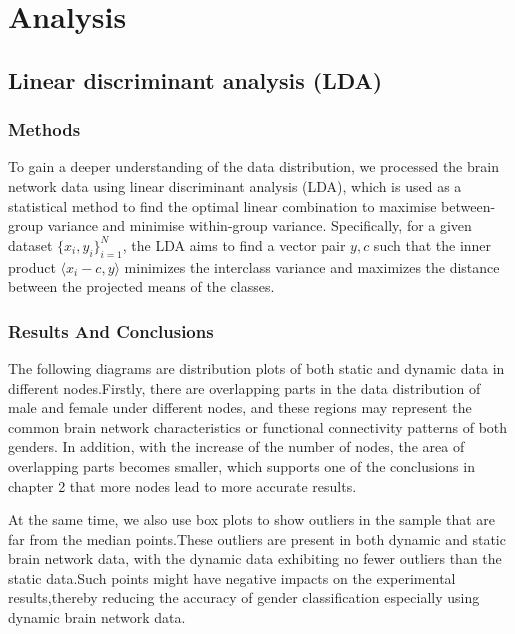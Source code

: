 \documentclass[11pt]{article}
\begin{document}
\section{Analysis}

\subsection{Linear discriminant analysis (LDA)}

\subsubsection{Methods}

To gain a deeper understanding of the data distribution, we processed the brain network data using linear discriminant analysis (LDA), which is used as a statistical method to find the optimal linear combination to maximise between-group variance and minimise within-group variance. Specifically, for a given dataset $\{x_i, y_i\}_{i=1}^N$, the LDA aims to find a vector pair $y, c$ such that the inner product $\langle x_i  - c, y \rangle$ minimizes the interclass variance and maximizes the distance between the projected means of the classes.

\subsubsection{Results And Conclusions}

The following diagrams are distribution plots of both static and dynamic data in different nodes.Firstly, there are overlapping parts in the data distribution of male and female under different nodes, and these regions may represent the common brain network characteristics or functional connectivity patterns of both genders. In addition, with the increase of the number of nodes, the area of overlapping parts becomes smaller, which supports one of the conclusions in chapter 2 that more nodes lead to more accurate results.

At the same time, we also use box plots to show outliers in the sample that are far from the median points.These outliers are present in both dynamic and static brain network data, with the dynamic data exhibiting no fewer outliers than the static data.Such points might have negative impacts on the experimental results,thereby reducing the accuracy of gender classification especially using dynamic brain network data.
\end{document}
